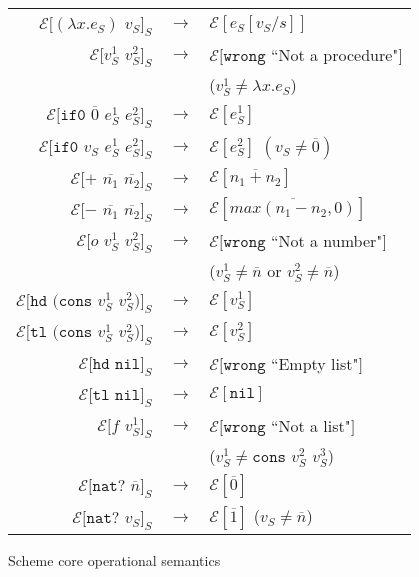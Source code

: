 \begin{figure}[p]
\label{scos}
\caption{Scheme core operational semantics}
\begin{center}
\begin{tabular}{rcl}
$\mathscr{E}[(\lambda x.e_{S})$ $v_{S}]_{S}$ & $\rightarrow$ & $\mathscr{E}[e_{S}[v_{S}/s]]$ \\
$\mathscr{E}[v_{S}^{1}$ $v_{S}^{2}]_{S}$ & $\rightarrow$ & $\mathscr{E}[\mathtt{wrong}$ ``Not a procedure"$]$ \\
&& ($v_{S}^{1}\neq\lambda x.e_{S}$) \\
$\mathscr{E}[\mathtt{if0}$ $\overline{0}$ $e_{S}^{1}$ $e_{S}^{2}]_{S}$ & $\rightarrow$ & $\mathscr{E}[e_{S}^{1}]$ \\
$\mathscr{E}[\mathtt{if0}$ $v_{S}$ $e_{S}^{1}$ $e_{S}^{2}]_{S}$ & $\rightarrow$ & $\mathscr{E}[e_{S}^{2}]$ $(v_{S}\neq\overline{0})$ \\
$\mathscr{E}[+$ $\overline{n_{1}}$ $\overline{n_{2}}]_{S}$ & $\rightarrow$ & $\mathscr{E}[\overline{n_{1}+n_{2}}]$ \\
$\mathscr{E}[-$ $\overline{n_{1}}$ $\overline{n_{2}}]_{S}$ & $\rightarrow$ & $\mathscr{E}[\overline{max(n_{1}-n_{2},0)}]$ \\
$\mathscr{E}[o$ $v_{S}^{1}$ $v_{S}^{2}]_{S}$ & $\rightarrow$ & $\mathscr{E}[\mathtt{wrong}$ ``Not a number"$]$ \\
&& ($v_{S}^{1}\neq\overline{n}$ or $v_{S}^{2}\neq\overline{n}$) \\
$\mathscr{E}[\mathtt{hd}$ $(\mathtt{cons}$ $v_{S}^{1}$ $v_{S}^{2})]_{S}$ & $\rightarrow$ & $\mathscr{E}[v_{S}^{1}]$ \\
$\mathscr{E}[\mathtt{tl}$ $(\mathtt{cons}$ $v_{S}^{1}$ $v_{S}^{2})]_{S}$ & $\rightarrow$ & $\mathscr{E}[v_{S}^{2}]$ \\
$\mathscr{E}[\mathtt{hd}$ $\mathtt{nil}]_{S}$ & $\rightarrow$ & $\mathscr{E}[\mathtt{wrong}$ ``Empty list"$]$ \\
$\mathscr{E}[\mathtt{tl}$ $\mathtt{nil}]_{S}$ & $\rightarrow$ & $\mathscr{E}[\mathtt{nil}]$ \\
$\mathscr{E}[f$ $v_{S}^{1}]_{S}$ & $\rightarrow$ & $\mathscr{E}[\mathtt{wrong}$ ``Not a list"$]$ \\
&& ($v_{S}^{1}\neq\mathtt{cons}$ $v_{S}^{2}$ $v_{S}^{3}$) \\
$\mathscr{E}[\mathtt{nat?}$ $\overline{n}]_{S}$ & $\rightarrow$ & $\mathscr{E}[\overline{0}]$ \\
$\mathscr{E}[\mathtt{nat?}$ $v_{S}]_{S}$ & $\rightarrow$ & $\mathscr{E}[\overline{1}]$ ($v_{S}\neq\overline{n}$) \\

\end{tabular}
\end{center}
\end{figure}
